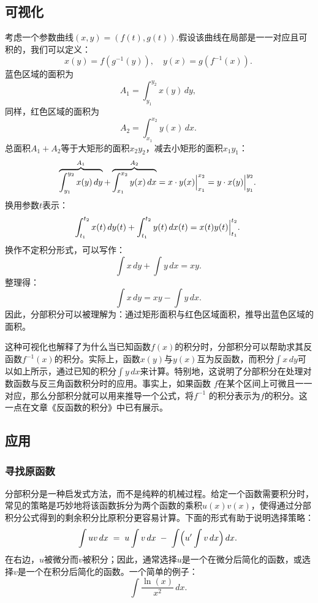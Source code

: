\subsection{可视化}
考虑一个参数曲线$(x,y) = (f(t), g(t))$.假设该曲线在局部是一一对应且可积的，我们可以定义：
$$
x(y) = f(g^{-1}(y)), \quad y(x) = g(f^{-1}(x)).~
$$
蓝色区域的面积为
$$
A_{1} = \int_{y_{1}}^{y_{2}} x(y)\,dy,~
$$
同样，红色区域的面积为
$$
A_{2} = \int_{x_{1}}^{x_{2}} y(x)\,dx.~
$$
总面积$A_1 + A_2$等于大矩形的面积$x_{2}y_{2}$，减去小矩形的面积$x_{1}y_{1}$：
$$
\overbrace{\int_{y_{1}}^{y_{2}} x(y)\,dy}^{A_{1}}
+ \overbrace{\int_{x_{1}}^{x_{2}} y(x)\,dx}^{A_{2}}
= \Bigl. x \cdot y(x) \Bigr|_{x_{1}}^{x_{2}}
= \Bigl. y \cdot x(y) \Bigr|_{y_{1}}^{y_{2}}.~
$$
换用参数$t$表示：
$$
\int_{t_{1}}^{t_{2}} x(t)\,dy(t) + \int_{t_{1}}^{t_{2}} y(t)\,dx(t) 
= \Bigl. x(t)y(t) \Bigr|_{t_{1}}^{t_{2}}.~
$$
换作不定积分形式，可以写作：
$$
\int x\,dy + \int y\,dx = xy.~
$$
整理得：
$$
\int x\,dy = xy - \int y\,dx.~
$$
因此，分部积分可以被理解为：通过矩形面积与红色区域面积，推导出蓝色区域的面积。

这种可视化也解释了为什么当已知函数$f(x)$的积分时，分部积分可以帮助求其反函数$f^{-1}(x)$的积分。实际上，函数$x(y)$与$y(x)$互为反函数，而积分$\int x\,dy$可以如上所示，通过已知的积分$\int y\,dx$来计算。特别地，这说明了分部积分在处理对数函数与反三角函数积分时的应用。事实上，如果函数 $f$在某个区间上可微且一一对应，那么分部积分就可以用来推导一个公式，将$f^{-1}$ 的积分表示为$f$的积分。这一点在文章《反函数的积分》中已有展示。
\subsection{应用}
\subsubsection{寻找原函数}
分部积分是一种启发式方法，而不是纯粹的机械过程。给定一个函数需要积分时，常见的策略是巧妙地将该函数拆分为两个函数的乘积$u(x)v(x)$，使得通过分部积分公式得到的剩余积分比原积分更容易计算。下面的形式有助于说明选择策略：
$$
\int uv\,dx \;=\; u \int v\,dx \;-\; \int \Bigl(u' \int v\,dx\Bigr)\,dx .~
$$
在右边，$u$被微分而$v$被积分；因此，通常选择$u$是一个在微分后简化的函数，或选择$v$是一个在积分后简化的函数。一个简单的例子：
$$
\int \frac{\ln(x)}{x^{2}}\,dx .~
$$
